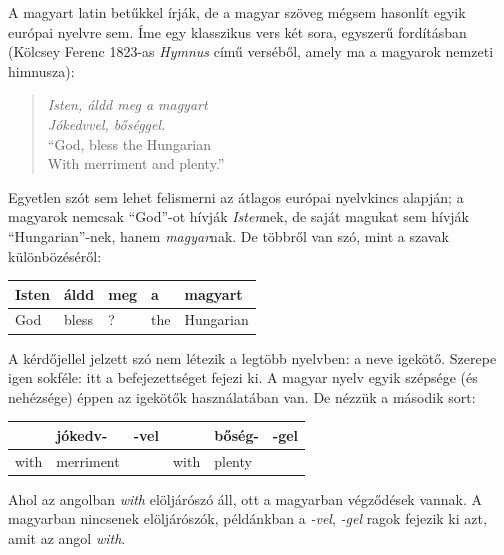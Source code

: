 \begin{multicols}{2}
  A magyart latin betűkkel írják, de a ma\-gyar szöveg mégsem hasonlít egyik európai nyelvre sem. Íme egy klasszikus vers két sora, egyszerű fordításban (Kölcsey Ferenc 1823-as \textit{Hymnus} című verséből, amely ma a magyarok nemzeti himnusza):

  \begin{verse}

  \textit{Isten, áldd meg a magyart}\\
  \textit{Jókedvvel, bőséggel.}\\
  "`God, bless the Hungarian\\
  With merriment and plenty."'
  \end{verse}

  Egyetlen szót sem lehet felismerni az átlagos európai nyelvkincs alapján; a magyarok nemcsak "`God"'-ot hívják \textit{Isten}nek, de saját magukat sem hívják "`Hungarian"'-nek, hanem \textit{magyar}nak. De többről van szó, mint a szavak különbözéséről:

  \vspace{3mm}

  \begin{tabular}{l|l|l|l|l}
      Isten & áldd & meg & a & magyart\\
      \hline
      God & bless & ? & the & Hungarian\\
    \end{tabular}

  \vspace{3mm}   

  A kérdőjellel jelzett szó nem létezik a legtöbb nyelvben: a neve igekötő. Szerepe igen sokféle: itt a befejezettséget fejezi ki. A magyar nyelv egyik szépsége (és nehézsége) éppen az igekötők használatában van. De nézzük a második sort:

  \vspace{3mm}

  \begin{tabular}{l|l|l|l|l|l}
      & jókedv- & -vel & & bőség- & -gel\\
      \hline
      with & merriment & & with & plenty & \\
    \end{tabular}

  \vspace{3mm}  

  Ahol az angolban \textit{with} elöljárószó áll, ott a ma\-gyar\-ban végződések vannak. A ma\-gyar\-ban nincsenek elöljárószók, pél\-dánk\-ban a \textit{-vel}, \textit{-gel} ragok fejezik ki azt, amit az angol \textit{with}.


\end{multicols}
